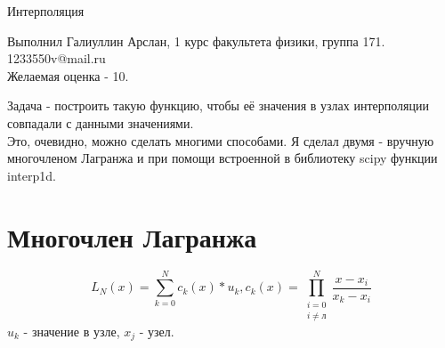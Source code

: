 \documentclass[12pt,a4paper]{scrartcl}
\author{А. А. Галиуллин}
\begin{document}
	
	\begin{center}
	\Large
	Интерполяция \\
	\end{center}
	\begin{center}
		\large
		Выполнил Галиуллин Арслан, 1 курс факультета физики, группа 171. \\
		1233550v@mail.ru \\
		Желаемая оценка - 10.
	\end{center}
	Задача - построить такую функцию, чтобы её значения в узлах интерполяции совпадали с данными значениями. \\
	Это, очевидно, можно сделать многими способами. Я сделал двумя - вручную многочленом Лагранжа и при помощи встроенной в библиотеку scipy функции interp1d. \\
	
	\section{Многочлен Лагранжа}
		$$L_N(x) = \sum_{k=0}^{N}c_k(x)*u_k, c_k(x) = \prod_{\begin{smallmatrix}i = 0\\i\neq л\end{smallmatrix}}^{N} \frac{x-x_i}{x_k-x_i}$$
		$u_k$ - значение в узле, $x_j$ - узел.
		\\ \\
		
		
\end{document}
